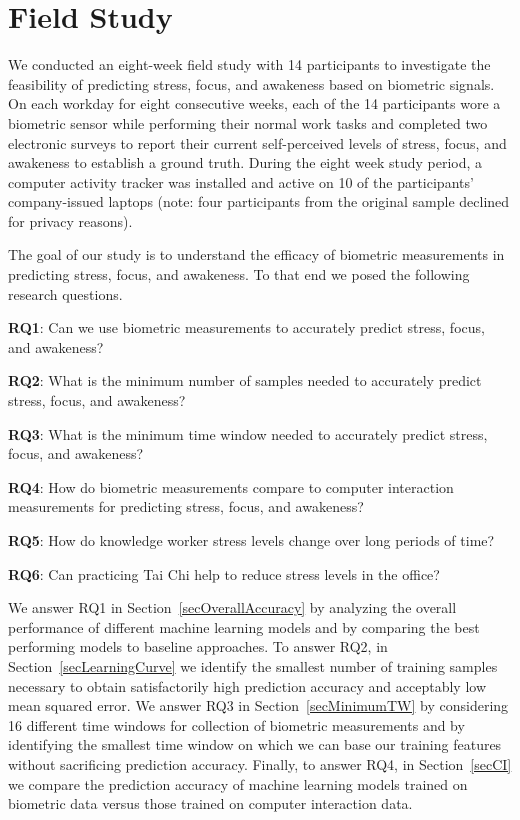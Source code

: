 \section{Field Study}
We conducted an eight-week field study with 14 participants to investigate the feasibility of predicting stress, focus, and awakeness based on biometric signals. On each workday for eight consecutive weeks, each of the 14 participants wore a biometric sensor while performing their normal work tasks and completed two electronic surveys to report their current self-perceived levels of stress, focus, and awakeness to establish a ground truth. During the eight week study period, a computer activity tracker was installed and active on 10 of the participants' company-issued laptops (note: four participants from the original sample declined for privacy reasons).

The goal of our study is to understand the efficacy of biometric measurements in predicting stress, focus, and awakeness. To that end we posed the following research questions.

\vspace{0.5em}
\noindent\textbf{RQ1}: Can we use biometric measurements to accurately predict stress,
focus, and awakeness? 

\vspace{0.5em}
\noindent\textbf{RQ2}: What is the minimum number of samples needed to accurately predict stress, focus, and awakeness? 

\vspace{0.5em}
\noindent\textbf{RQ3}: What is the minimum time window needed to accurately predict stress, focus, and awakeness? 

\vspace{0.5em}
\noindent\textbf{RQ4}: How do biometric measurements compare to computer interaction measurements for predicting stress, focus, and awakeness?

\vspace{0.5em}
\noindent\textbf{RQ5}: How do knowledge worker stress levels change over long periods of time?

\vspace{0.5em}
\noindent\textbf{RQ6}: Can practicing Tai Chi help to reduce stress levels in the office?

\vspace{0.5em}

We answer RQ1 in Section~\ref{secOverallAccuracy} by analyzing the overall performance of different
machine learning models and by comparing the best performing models to baseline approaches.
To answer RQ2, in Section~\ref{secLearningCurve} we identify the smallest number of training samples necessary to obtain satisfactorily high prediction accuracy and acceptably low mean squared error.
We answer RQ3 in Section~\ref{secMinimumTW} by considering 16 different time windows for collection of biometric measurements and by identifying the smallest time window on which we can base our training features without sacrificing prediction accuracy.
Finally, to answer RQ4, in Section~\ref{secCI} we compare the prediction accuracy of machine learning models trained on biometric data versus those trained on computer interaction data.


